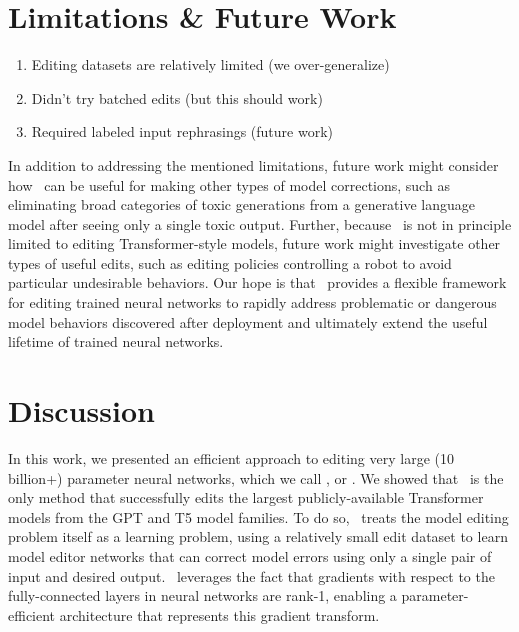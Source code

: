 \documentclass{article}
\begin{document}
\section{Limitations \& Future Work}
\begin{enumerate}
    \item Editing datasets are relatively limited (we over-generalize)
    \item Didn't try batched edits (but this should work)
    \item Required labeled input rephrasings (future work)
\end{enumerate}
In addition to addressing the mentioned limitations, future work might consider how \name~can be useful for making other types of model corrections, such as eliminating broad categories of toxic generations from a generative language model after seeing only a single toxic output. Further, because \name~is not in principle limited to editing Transformer-style models, future work might investigate other types of useful edits, such as editing policies controlling a robot to avoid particular undesirable behaviors. Our hope is that \name~provides a flexible framework for editing trained neural networks to rapidly address problematic or dangerous model behaviors discovered after deployment and ultimately extend the useful lifetime of trained neural networks.
\section{Discussion}
In this work, we presented an efficient approach to editing very large (10 billion+) parameter neural networks, which we call \fullname, or \name. We showed that \name~is the only method that successfully edits the largest publicly-available Transformer models from the GPT and T5 model families. To do so, \name~treats the model editing problem itself as a learning problem, using a relatively small edit dataset to learn model editor networks that can correct model errors using only a single pair of input and desired output. \name~leverages the fact that gradients with respect to the fully-connected layers in neural networks are rank-1, enabling a parameter-efficient architecture that represents this gradient transform.



\newpage



\newpage

\appendix


\end{document}
